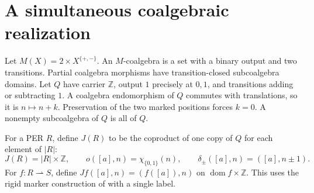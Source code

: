 \documentclass[11pt]{article}
\theoremstyle{definition}
\newcommand{\dom}{\operatorname{dom}}
\begin{document}
\section{A simultaneous coalgebraic realization}\label{sec:realization}

Let $M(X)=2\times X^{\{+,-\}}$. An $M$-coalgebra is a set with
a binary output and two transitions. Partial coalgebra morphisms have
transition-closed subcoalgebra domains. Let $Q$ have carrier
$\mathbb Z$, output $1$ precisely at $0,1$, and transitions adding
or subtracting $1$. A coalgebra endomorphism of $Q$ commutes with
translations, so it is $n\mapsto n+k$. Preservation of the two
marked positions forces $k=0$. A nonempty subcoalgebra of $Q$ is
all of $Q$.

For a PER $R$, define $J(R)$ to be the coproduct of one copy of
$Q$ for each element of $|R|$:
\[
 J(R)=|R|\times\mathbb Z,\qquad
 o([a],n)=\chi_{\{0,1\}}(n),\qquad
 \delta_\pm([a],n)=([a],n\pm1).
\]
For $f:R\rightharpoonup S$, define
$Jf([a],n)=(f([a]),n)$ on $\dom f\times\mathbb Z$.
This uses the rigid marker construction of \cite[Section 4]{Catalogue}
with a single label.
\end{document}
